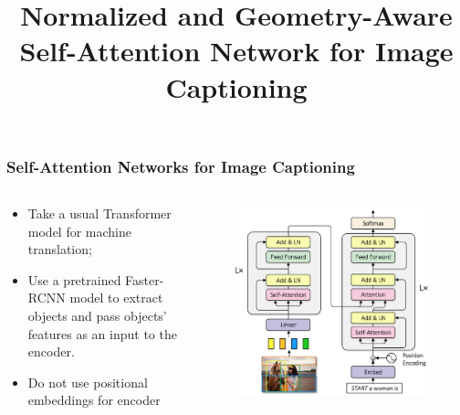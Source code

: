 \documentclass[handout, 10pt]{beamer}
\title{Normalized and Geometry-Aware Self-Attention Network for Image Captioning}
\begin{document}
\begin{frame}
    \titlepage
\end{frame}

\begin{frame}
\frametitle{Self-Attention Networks for Image Captioning}

\begin{columns}
\begin{column}{0.5\textwidth}
\begin{itemize}
    \item\pause Take a usual Transformer model for machine translation;
    \item\pause Use a pretrained Faster-RCNN model to extract objects and pass objects' features as an input to the encoder.
    \item\pause Do not use positional embeddings for encoder
\end{itemize}
\end{column}
\begin{column}{0.5\textwidth}
\pause
\begin{figure}
    \centering
    \includegraphics[width=\textwidth]{images/san.png}
\end{figure}
\end{column}
\end{columns}

\end{frame}
\end{document}
